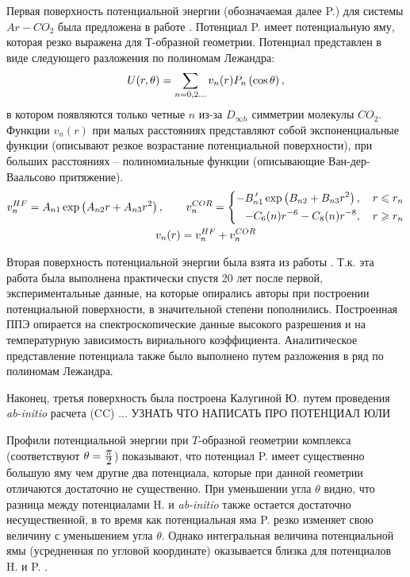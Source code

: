 Первая поверхность потенциальной энергии (обозначаемая далее P.) для системы $Ar-CO_2$ была предложена в работе \cite{parker1976}. Потенциал P. имеет потенциальную яму, которая резко выражена для Т-образной геометрии. Потенциал представлен в виде следующего разложения по полиномам Лежандра:
\vverh
\begin{gather}
	U(r, \theta) = \sum_{n = 0, 2 \dots} v_n(r) P_n \left( \cos \theta \right), \notag
\end{gather}
в котором появляются только четные $n$ из-за $D_{\infty h}$ симметрии молекулы $CO_2$. Функции $v_n(r)$ при малых расстояниях представляют собой экспоненциальные функции (описывают резкое возрастание потенциальной поверхности), при больших расстояниях -- полиномиальные функции (описывающие Ван-дер-Ваальсово притяжение). 
\vverh
\begin{gather}
	v_n^{HF} = A_{n1} \exp \left( A_{n2} r + A_{n3} r^2 \right), \notag \quad \quad 
	v_n^{COR} = \left\{
	\begin{aligned}
		- B_{n1}^{\, \prime} \exp \left( B_{n2} + B_{n3} r^2 \right), \quad r \leqslant r_n \\
		-C_6(n) r^{-6} - C_8(n) r^{-8}, \quad r \geqslant r_n
	\end{aligned} \right. \notag \\
	v_n(r) = v_n^{HF} + v_n^{COR} \notag 
\end{gather}

Вторая поверхность потенциальной энергии была взята из работы \cite{hutson1996}. Т.к. эта работа была выполнена практически спустя 20 лет после первой, экспериментальные данные, на которые опирались авторы при построении потенциальной поверхности, в значительной степени пополнились. Построенная ППЭ опирается на спектроскопические данные высокого разрешения и на температурную зависимость вириального коэффициента. Аналитическое представление потенциала также было выполнено путем разложения в ряд по полиномам Лежандра.  

Наконец, третья поверхность была построена Калугиной Ю. путем проведения \textit{ab-initio} расчета (CC) ... 
УЗНАТЬ ЧТО НАПИСАТЬ ПРО ПОТЕНЦИАЛ ЮЛИ


Профили потенциальной энергии при $T$-образной геометрии комплекса (соответствуют $\theta = \frac{\displaystyle \pi}{\displaystyle 2}$) показывают, что потенциал P. имеет существенно большую яму чем другие два потенциала, которые при данной геометрии отличаются достаточно не существенно. При уменьшении угла $\theta$ видно, что разница между потенциалами H. и \textit{ab-initio} также остается достаточно несущественной, в то время как потенциальная яма P. резко изменяет свою величину с уменьшением угла $\theta$. Однако интегральная величина потенциальной ямы (усредненная по угловой координате) оказывается близка для потенциалов H. и P. \cite{hutson1996}.
